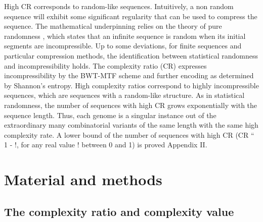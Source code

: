 High CR corresponds to random-like sequences. Intuitively, a non random sequence will exhibit some significant regularity that can be used to compress the sequence. The mathematical underpinning relies on the theory of pure randomness \cite{Chaitin1975,Nies2009}, which states that an infinite sequence is random when its initial segments are incompressible. Up to some deviations, for finite sequences and particular compression methods, the identification between statistical randomness and incompressibility holds. The complexity ratio (CR) expresses incompressibility by the BWT-MTF scheme and further encoding as determined by Shannon's entropy. High complexity ratios correspond to highly incompressible sequences, which are sequences with a random-like structure. As in statistical randomness, the number of sequences with high CR grows exponentially with the sequence length. Thus, each genome is a singular instance out of the extraordinary many combinatorial variants of the same length with the same high complexity rate. A lower bound of the number of sequences with high CR (CR `` 1 - !, for any real value ! between 0 and 1) is proved Appendix II.


\section{Material and methods}
\label{sec:dna_struct-matmet}

\subsection{The complexity ratio and complexity value}
\label{sec:compl-ratio-compl}

